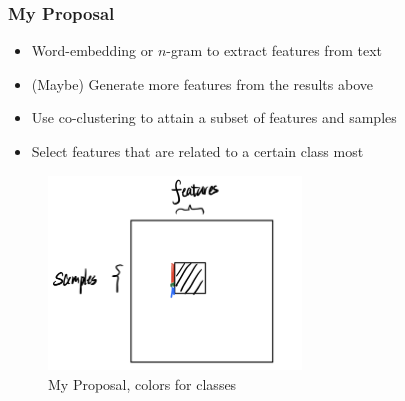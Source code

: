 \documentclass[11pt]{beamer}
\begin{document}
\begin{frame}
    \frametitle{My Proposal}
    \begin{itemize}
        \item Word-embedding or $n$-gram to extract features from text
        \item (Maybe) Generate more features from the results above
        \item Use co-clustering to attain a subset of features and samples
        \item Select features that are related to a certain class most
    \end{itemize}
    \begin{figure}[htbp]
        \centering
        \includegraphics[width=0.6\textwidth]{mypro.jpeg}
        \caption{My Proposal, colors for classes}
    \end{figure}
\end{frame}

\end{document}
